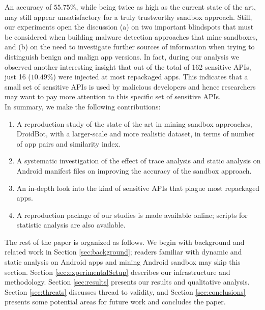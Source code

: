 An accuracy of $55.75\%$, while being twice as high as the current state of the art, may still appear unsatisfactory for a truly trustworthy sandbox approach. Still, 
our experiments open the discussion (a) on two important blindspots that must be considered when building 
malware detection approaches that mine sandboxes, and (b) on the need to investigate further sources of information when trying to distinguish benign and malign app versions. 
In fact, during our analysis we observed another interesting insight that out of the total of 162 sensitive 
APIs, just 16 ($10.49$\%) were injected at most repackaged apps. 
This indicates that a small set of sensitive APIs is used by malicious developers and hence 
researchers may want to pay more attention to this specific set of sensitive APIs.\\


\noindent
In summary, we make the following contributions:

\begin{enumerate}[1.]
\item A reproduction study of the state of the art in mining sandbox approaches, DroidBot, 
with a larger-scale and more realistic dataset, in terms of number of app pairs and similarity index.
\item A systematic investigation of the effect of trace analysis and static analysis on Android manifest files 
on improving the accuracy of the sandbox approach.
\item An in-depth look into the kind of sensitive APIs that plague most repackaged apps.
\item A reproduction package of our studies is made available online; scripts for statistic analysis are also available.%
\end{enumerate}


The rest of the paper is organized as follows. We begin with background and related work in Section \ref{sec:background};
readers familiar with dynamic and static analysis on Android apps and mining Android sandbox may skip this section.
Section \ref{sec:experimentalSetup} describes our infrastructure and methodology. Section \ref{sec:results} presents our results and qualitative analysis. Section \ref{sec:threats} discusses thread to validity, and Section \ref{sec:conclusions} 
presents some potential areas for future work and concludes the paper.




